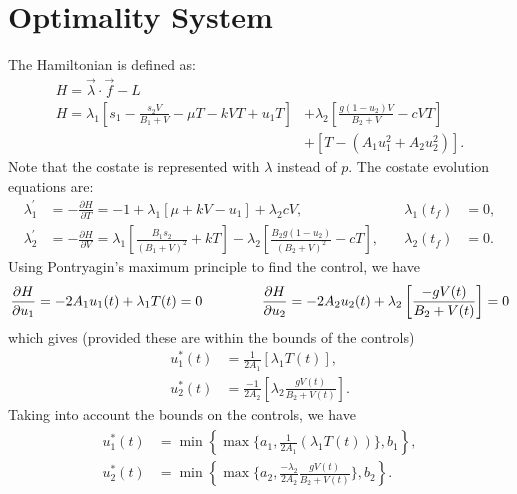 \section*{Optimality System}
The Hamiltonian is defined as:
\begin{align*}
	H = \vec{\lambda} \cdot \vec{f} - L\\
	H =\lambda_1\left[ s_1 - \frac{s_2V}{B_1+V}-\mu T-kVT+u_1T \right] &+ \lambda_2 \left[\frac{g(1-u_2)V}{B_2+V}-cVT\right]\\
	 &+  \left[T-(A_1u_1^2+A_2u_2^2)\right].
\end{align*}
Note that the costate is represented with $\lambda$ instead of $p$.
The costate evolution equations are:
\begin{equation}
    \begin{alignedat}{2}
        \lambda_1^{'} &=-\frac{\partial H}{\partial T} =  -1+\lambda_1[\mu+kV-u_1]+\lambda_2cV, & \lambda_1(t_f) &= 0, \\
        \lambda_2^{'} &= -\frac{\partial H}{\partial V} = \lambda_1\left[\frac{B_1s_2}{(B_1+V)^2}+kT\right] -\lambda_2\left[\frac{B_2g(1-u_2)} {(B_2+V)^2}-cT\right], \quad & \lambda_2(t_f) &= 0.
    \end{alignedat}
    \label{eq:hiv:costate}
\end{equation}
Using Pontryagin's maximum principle to find the control, we have
\begin{equation*}
\frac{\partial H}{\partial u_1} = -2A_1u_1(t)+\lambda_1T(t)=0 \hspace{1.5cm}
\frac{\partial H}{\partial u_2} = -2A_2u_2(t)+\lambda_2\left[\frac{-gV(t)}{B_2+V(t)}\right]=0
\end{equation*}
which gives (provided these are within the bounds of the controls)
\begin{align*}
	u_1^*(t) &= \frac{1}{2A_1}\left[\lambda_1T(t)\right],\\
	u_2^*(t) &= \frac{-1}{2A_2}\left[\lambda_2\frac{gV(t)}{B_2+V(t)}\right].
\end{align*}
Taking into account the bounds on the controls, we have
\begin{align}
	\begin{split}
		u_1^*(t)&=\min\left\{\max\{a_1,\frac{1}{2A_1}(\lambda_1T(t))\},b_1\right\},\\
		u_2^*(t)&=\min\left\{\max\{a_2,\frac{-\lambda_2}{2A_2}\frac{gV(t)}{B_2+V(t)}\},b_2\right\}.
	\end{split}
    \label{eq:hiv:optimal_control}
\end{align}

